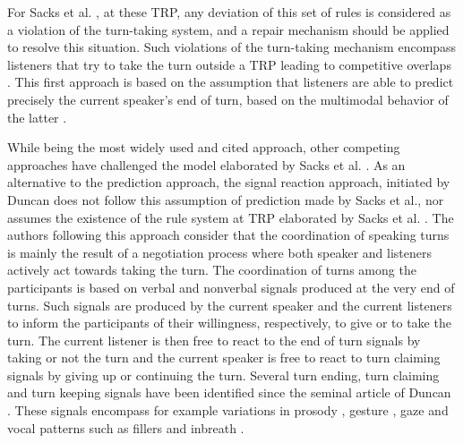 For Sacks et al. \citep{sacks_simplest_1974}, at these TRP, any deviation of this set of rules is considered
as a violation of the turn-taking system, and a
repair mechanism should be applied to resolve this situation.
Such violations of the turn-taking mechanism
encompass listeners that try to take the turn outside a
TRP leading to competitive overlaps \citep{schegloff_overlapping_2000}.
This first approach is based on the assumption that
listeners are able to predict precisely the current speaker's end of turn, based on the multimodal behavior
of the latter \citep{de_ruiter_projecting_2006,french_turn-competitive_1983,ford_interactional_1996,mondada_multimodal_2007}. 

While being the most widely used and cited approach, other competing approaches have challenged the model elaborated by Sacks et al. \citep{sacks_simplest_1974}.
As an alternative to the prediction approach, the signal reaction approach, initiated by Duncan \citep{duncan_signals_1972} does
not follow this assumption of prediction made by Sacks et al., nor assumes
the existence of the rule system at TRP elaborated by Sacks et al. \citep{sacks_simplest_1974}. The authors following this approach consider
that the coordination of speaking turns is mainly
the result of a negotiation process where both speaker
and listeners actively act towards taking the turn. The
coordination of turns among the participants is based
on verbal and nonverbal signals produced at the very
end of turns. Such signals are produced by the current
speaker and the current listeners to inform the participants
of their willingness, respectively, to give or to take
the turn. The current listener is then free to react to the
end of turn signals by taking or not the turn and the
current speaker is free to react to turn claiming
signals by giving up or continuing the turn. Several turn ending, turn claiming and turn keeping signals have been identified since the seminal article of Duncan \citep{duncan_signals_1972}. These signals encompass for example variations in prosody \citep{duncan_signals_1972,gravano_turn-taking_2011,hjalmarsson_additive_2011}, gesture \citep{duncan_signals_1972,mondada_multimodal_2007}, gaze \citep{kendon_functions_1967,novick_coordinating_1996,oertel_gaze_2013} and vocal patterns such as fillers \citep{benus_pragmatic_2011} and inbreath \citep{torreira_breathing_2015}.  

